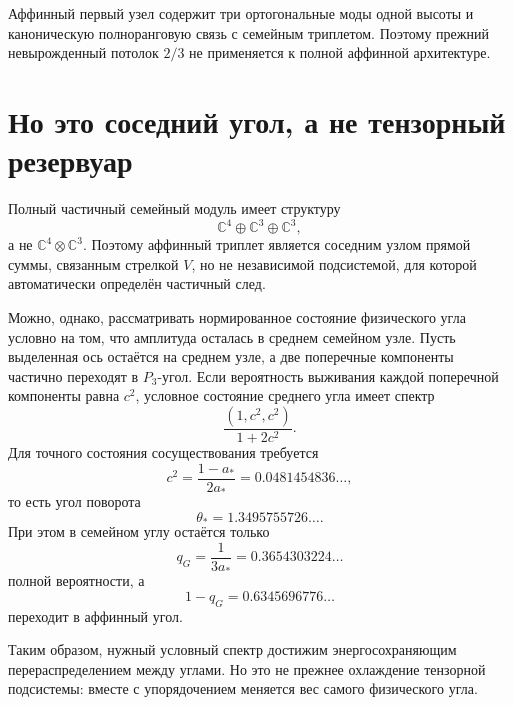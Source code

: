 \begin{proposition}
Аффинный первый узел содержит три ортогональные моды одной высоты и
каноническую полноранговую связь с семейным триплетом. Поэтому прежний
невырожденный потолок $2/3$ не применяется к полной аффинной архитектуре.
\end{proposition}

\section{Но это соседний угол, а не тензорный резервуар}

Полный частичный семейный модуль имеет структуру
\begin{equation}
 \mathbb C^4\oplus\mathbb C^3\oplus\mathbb C^3,
\end{equation}
а не $\mathbb C^4\otimes\mathbb C^3$. Поэтому аффинный триплет является
соседним узлом прямой суммы, связанным стрелкой $V$, но не независимой
подсистемой, для которой автоматически определён частичный след.

Можно, однако, рассматривать нормированное состояние физического угла
условно на том, что амплитуда осталась в среднем семейном узле. Пусть
выделенная ось остаётся на среднем узле, а две поперечные компоненты
частично переходят в $P_3$-угол. Если вероятность выживания каждой
поперечной компоненты равна $c^2$, условное состояние среднего угла имеет
спектр
\begin{equation}
 \frac{(1,c^2,c^2)}{1+2c^2}.
\end{equation}
Для точного состояния сосуществования требуется
\begin{equation}
 c^2=\frac{1-a_*}{2a_*}
 =0.0481454836\ldots,
 \label{eq:v6-affine-selective-survival}
\end{equation}
то есть угол поворота
\begin{equation}
 \theta_*=1.3495755726\ldots.
\end{equation}
При этом в семейном углу остаётся только
\begin{equation}
 q_G=\frac1{3a_*}=0.3654303224\ldots
\end{equation}
полной вероятности, а
\begin{equation}
 1-q_G=0.6345696776\ldots
\end{equation}
переходит в аффинный угол.

Таким образом, нужный условный спектр достижим энергосохраняющим
перераспределением между углами. Но это не прежнее охлаждение тензорной
подсистемы: вместе с упорядочением меняется вес самого физического угла.

